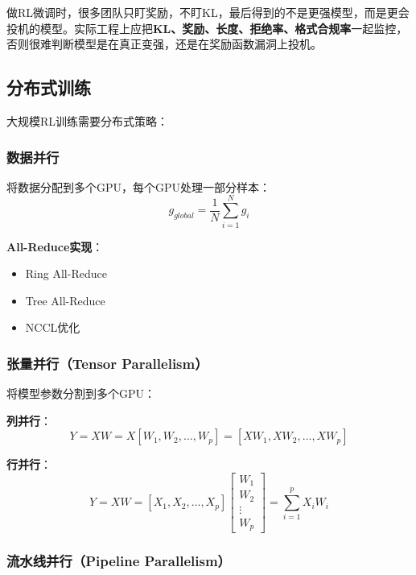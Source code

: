 \documentclass[12pt,a4paper]{article}
\begin{document}
做RL微调时，很多团队只盯奖励，不盯KL，最后得到的不是更强模型，而是更会投机的模型。实际工程上应把\textbf{KL、奖励、长度、拒绝率、格式合规率}一起监控，否则很难判断模型是在真正变强，还是在奖励函数漏洞上投机。

\subsection{分布式训练}

大规模RL训练需要分布式策略：

\subsubsection{数据并行}

将数据分配到多个GPU，每个GPU处理一部分样本：
\begin{equation}
g_{global} = \frac{1}{N}\sum_{i=1}^{N} g_i
\end{equation}

\textbf{All-Reduce实现}：
\begin{itemize}
    \item Ring All-Reduce
    \item Tree All-Reduce
    \item NCCL优化
\end{itemize}

\subsubsection{张量并行（Tensor Parallelism）}

将模型参数分割到多个GPU：

\textbf{列并行}：
\begin{equation}
Y = XW = X[W_1, W_2, \ldots, W_p] = [XW_1, XW_2, \ldots, XW_p]
\end{equation}

\textbf{行并行}：
\begin{equation}
Y = XW = [X_1, X_2, \ldots, X_p] \begin{bmatrix} W_1 \\ W_2 \\ \vdots \\ W_p \end{bmatrix} = \sum_{i=1}^{p} X_i W_i
\end{equation}

\subsubsection{流水线并行（Pipeline Parallelism）}
\end{document}
